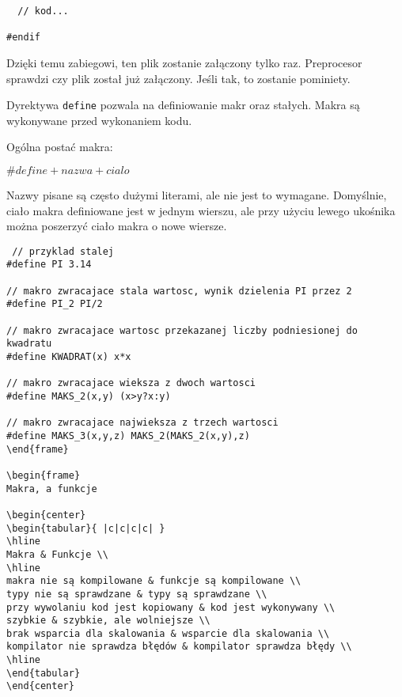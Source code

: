 \documentclass[notheorems, aspectratio=54]{beamer}
\begin{document}
\begin{frame}
\begin{frame}
\begin{lstlisting}
  // kod...

#endif
		\end{lstlisting}
		
		Dzięki temu zabiegowi, ten plik zostanie załączony tylko raz. Preprocesor sprawdzi czy plik został już załączony.
		Jeśli tak, to zostanie pominiety.
	\end{frame}
	
	\begin{frame}
		Dyrektywa \texttt{define} pozwala na definiowanie makr oraz stałych. 
		Makra są wykonywane przed wykonaniem kodu. 
		
		Ogólna postać makra:
		
		$\# define + nazwa + cialo$
		
		Nazwy pisane są często dużymi literami, ale nie jest to wymagane.
		Domyślnie, ciało makra definiowane jest w jednym wierszu, 
		ale przy użyciu lewego ukośnika można poszerzyć ciało makra o nowe wiersze.
		
		\begin{lstlisting}
 // przyklad stalej
#define PI 3.14

// makro zwracajace stala wartosc, wynik dzielenia PI przez 2
#define PI_2 PI/2

// makro zwracajace wartosc przekazanej liczby podniesionej do kwadratu
#define KWADRAT(x) x*x

// makro zwracajace wieksza z dwoch wartosci
#define MAKS_2(x,y) (x>y?x:y)

// makro zwracajace najwieksza z trzech wartosci
#define MAKS_3(x,y,z) MAKS_2(MAKS_2(x,y),z) 
\end{frame}

\begin{frame}
Makra, a funkcje

\begin{center}
\begin{tabular}{ |c|c|c|c| } 
\hline
Makra & Funkcje \\
\hline
makra nie są kompilowane & funkcje są kompilowane \\
typy nie są sprawdzane & typy są sprawdzane \\
przy wywolaniu kod jest kopiowany & kod jest wykonywany \\
szybkie & szybkie, ale wolniejsze \\
brak wsparcia dla skalowania & wsparcie dla skalowania \\
kompilator nie sprawdza błędów & kompilator sprawdza błędy \\
\hline
\end{tabular}
\end{center}


\end{lstlisting}
\end{frame}
\end{frame}
\end{document}
